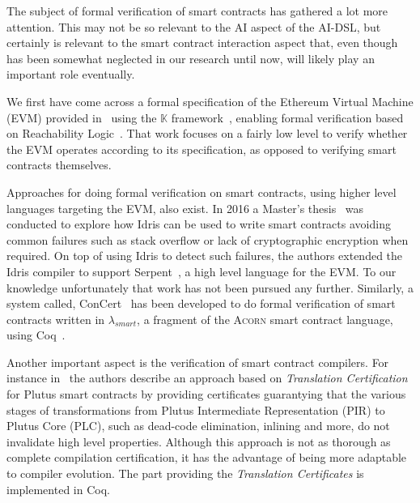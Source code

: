 \documentclass[]{report}
\begin{document}
The subject of formal verification of smart contracts has gathered a
lot more attention.  This may not be so relevant to the AI aspect of
the AI-DSL, but certainly is relevant to the smart contract
interaction aspect that, even though has been somewhat neglected in
our research until now, will likely play an important role eventually.

We first have come across a formal specification of the Ethereum
Virtual Machine (EVM) provided in~\cite{Hildenbrandt2018} using the
$\mathbb{K}$ framework~\cite{Xiaohong2019}, enabling formal
verification based on Reachability Logic~\cite{Alechina2000}.  That
work focuses on a fairly low level to verify whether the EVM operates
according to its specification, as opposed to verifying smart
contracts themselves.

Approaches for doing formal verification on smart contracts, using
higher level languages targeting the EVM, also exist.  In 2016 a
Master's thesis~\cite{Pettersson2016} was conducted to explore how
Idris can be used to write smart contracts avoiding common failures
such as stack overflow or lack of cryptographic encryption when
required.  On top of using Idris to detect such failures, the authors
extended the Idris compiler to support Serpent~\cite{Delmolino2015}, a
high level language for the EVM.  To our knowledge unfortunately that
work has not been pursued any further.  Similarly, a system called,
ConCert~\cite{Annenkov2020} has been developed to do formal
verification of smart contracts written in $\lambda_{smart}$, a
fragment of the \textsc{Acorn} smart contract language, using
Coq~\cite{Bertot2004}.

Another important aspect is the verification of smart contract
compilers.  For instance in~\cite{Krijnen2022} the authors describe an
approach based on \emph{Translation Certification} for Plutus smart
contracts by providing certificates guarantying that the various
stages of transformations from Plutus Intermediate Representation
(PIR) to Plutus Core (PLC), such as dead-code elimination, inlining
and more, do not invalidate high level properties.  Although this
approach is not as thorough as complete compilation certification, it
has the advantage of being more adaptable to compiler evolution.  The
part providing the \emph{Translation Certificates} is implemented in
Coq.
\end{document}

